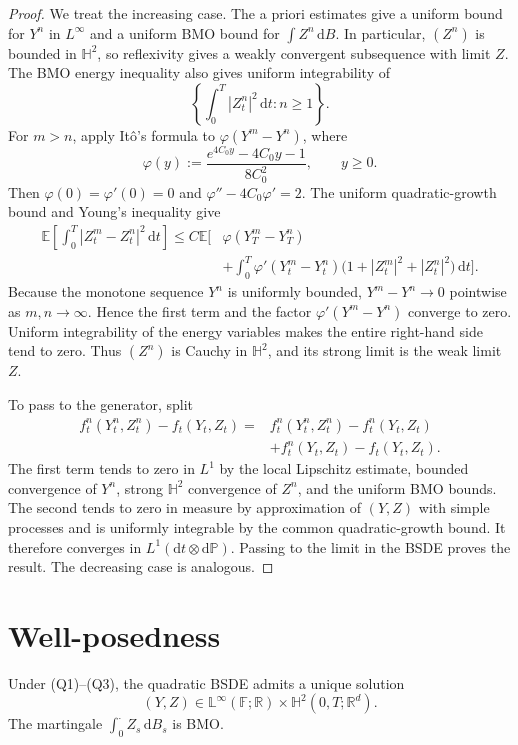 \begin{proof}
We treat the increasing case.  The a priori estimates give a uniform
bound for $Y^n$ in $L^\infty$ and a uniform BMO bound for
$\int Z^n\,\mathrm dB$.  In particular, $(Z^n)$ is bounded in
$\mathbb H^2$, so reflexivity gives a weakly convergent subsequence with
limit $Z$.  The BMO energy inequality also gives uniform integrability of
\[
  \left\{\int_0^T|Z_t^n|^2\,\mathrm dt:n\ge1\right\}.
\]
For $m>n$, apply It\^o's formula to $\varphi(Y^m-Y^n)$, where
\[
  \varphi(y):=\frac{e^{4C_0y}-4C_0y-1}{8C_0^2},
  \qquad y\ge0.
\]
Then $\varphi(0)=\varphi'(0)=0$ and
$\varphi''-4C_0\varphi'=2$.  The uniform quadratic-growth bound and
Young's inequality give
\[
\begin{aligned}
  \mathbb E\!\left[
    \int_0^T|Z_t^m-Z_t^n|^2\,\mathrm dt
  \right]
  \le C\mathbb E\!\Bigg[&
    \varphi(Y_T^m-Y_T^n)\\
    &+\int_0^T\varphi'(Y_t^m-Y_t^n)
      \bigl(1+|Z_t^m|^2+|Z_t^n|^2\bigr)\,\mathrm dt
  \Bigg].
\end{aligned}
\]
Because the monotone sequence $Y^n$ is uniformly bounded,
$Y^m-Y^n\to0$ pointwise as $m,n\to\infty$.  Hence the first term and the
factor $\varphi'(Y^m-Y^n)$ converge to zero.  Uniform integrability of the
energy variables makes the entire right-hand side tend to zero.  Thus
$(Z^n)$ is Cauchy in $\mathbb H^2$, and its strong limit is the weak limit
$Z$.

To pass to the generator, split
\[
\begin{aligned}
  f_t^n(Y_t^n,Z_t^n)-f_t(Y_t,Z_t)
  ={}&f_t^n(Y_t^n,Z_t^n)-f_t^n(Y_t,Z_t)\\
     &+f_t^n(Y_t,Z_t)-f_t(Y_t,Z_t).
\end{aligned}
\]
The first term tends to zero in $L^1$ by the local Lipschitz estimate,
bounded convergence of $Y^n$, strong $\mathbb H^2$ convergence of $Z^n$,
and the uniform BMO bounds.  The second tends to zero in measure by
approximation of $(Y,Z)$ with simple processes and is uniformly
integrable by the common quadratic-growth bound.  It therefore converges
in $L^1(\mathrm dt\otimes\mathrm d\mathbb P)$.  Passing to the limit in
the BSDE proves the result.  The decreasing case is analogous.
\end{proof}

\section{Well-posedness}

\begin{thm}
Under \textup{(Q1)}--\textup{(Q3)}, the quadratic BSDE admits a unique
solution
\[
  (Y,Z)\in\mathbb L^\infty(\mathbb F;\mathbb R)
  \times\mathbb H^2(0,T;\mathbb R^d).
\]
The martingale $\int_0^\cdot Z_s\,\mathrm dB_s$ is BMO\@.
\end{thm}

